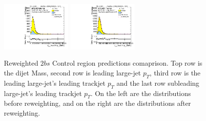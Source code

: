 \begin{figure}[htbp!]
\begin{center}
\includegraphics[width=0.31\textwidth,angle=-90]{figures/boosted/Prereweight/Moriond_TwoTag_split_Control_sublHCand_trk0_Pt.pdf}
\includegraphics[width=0.31\textwidth,angle=-90]{figures/boosted/Control/b77_TwoTag_split_Control_sublHCand_trk0_Pt.pdf}\\
\caption{Reweighted $2bs$ Control region predictions comaprison. Top row is the dijet Mass, second row is leading large-\R jet $p_{T}$, third row is the leading large-\R jet's leading trackjet $p_T$ and the last row subleading large-\R jet's leading trackjet $p_T$. On the left are the distributions before reweighting, and on the right are the distributions after reweighting.}
\label{fig:rw-2bs-comp-cr}
\end{center}
\end{figure}


